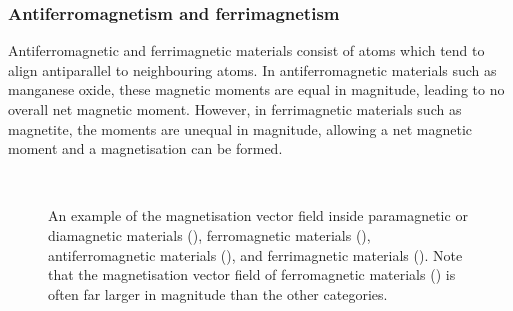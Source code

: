 \subsubsection{Antiferromagnetism and ferrimagnetism}
Antiferromagnetic and ferrimagnetic materials consist of atoms which tend to align antiparallel to neighbouring atoms. In antiferromagnetic materials such as manganese oxide, these magnetic moments are equal in magnitude, leading to no overall net magnetic moment. However, in ferrimagnetic materials such as magnetite, the moments are unequal in magnitude, allowing a net magnetic moment and a magnetisation can be formed.

\begin{figure}
    \centering
    \hfill
    \begin{subfigure}{0.475\textwidth}
        \centering
        
        \label{fig:magneticCategories:paramagnetismDiamagnetism}
    \end{subfigure}
    \hfill
    \begin{subfigure}{0.475\textwidth}
        \centering
        
        \label{fig:magneticCategories:ferromagnetism}
    \end{subfigure}
    \hfill \\ \vspace{1cm} \hfill
    \begin{subfigure}{0.475\textwidth}
        \centering
        
        \label{fig:magneticCategories:antiferromagnetism}
    \end{subfigure}
    \hfill
    \begin{subfigure}{0.475\textwidth}
        \centering
        
        \label{fig:magneticCategories:ferrimagneitsm}
    \end{subfigure}
    \hfill
    \caption{An example of the magnetisation vector field inside paramagnetic or diamagnetic materials (), ferromagnetic materials (), antiferromagnetic materials (), and ferrimagnetic materials (). Note that the magnetisation vector field of ferromagnetic materials () is often far larger in magnitude than the other categories.}
    \label{fig:magneticCategories}
\end{figure}

